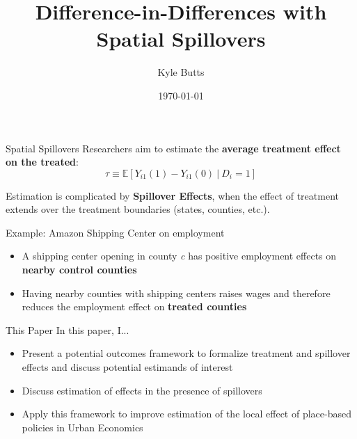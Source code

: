 \documentclass[aspectratio=169,t]{beamer}
\title{Difference-in-Differences with Spatial Spillovers}
\date{\today}
\author{Kyle Butts}
\begin{document}
\maketitle

\begin{frame}{Spatial Spillovers}
    Researchers aim to estimate the \textbf{average treatment effect on the treated}: 
    \[
        \tau \equiv \mathbb{E} \left[ Y_{i1}(1) - Y_{i1}(0) \ \vert \ D_{i} = 1 \right]
    \]
    
    Estimation is complicated by \textbf{Spillover Effects}, when the effect of treatment extends over the treatment boundaries (states, counties, etc.). 
    
    Example: Amazon Shipping Center on employment
    
    \begin{itemize}
        \item A shipping center opening in county \textit{c} has positive employment effects on \textbf{nearby control counties}
        
        \item Having nearby counties with shipping centers raises wages and therefore reduces the employment effect on \textbf{treated counties}
    \end{itemize}
\end{frame}

\begin{frame}{This Paper}
    In this paper, I...

    \begin{itemize}
        \item Present a potential outcomes framework to formalize treatment and spillover effects and discuss potential estimands of interest
        
        \item Discuss estimation of effects in the presence of spillovers
        
        \item Apply this framework to improve estimation of the local effect of place-based policies in Urban Economics 
    \end{itemize}

\end{frame}
\end{document}
